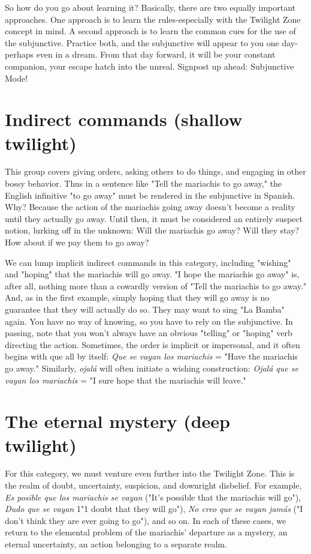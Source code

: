 \documentclass[14pt,a4paper,oneside]{memoir}
\begin{document}
So how do you go about learning it? Basically, there are two
equally important approaches. One approach is to learn the
rules-especially with the Twilight Zone concept in mind. A second
approach is to learn the common cues for the use of the subjunctive.
Practice both, and the subjunctive will appear to you one day-perhaps
even in a dream. From that day forward, it will be your constant companion, your escape hatch into the unreal. Signpost up ahead: Subjunctive Mode!

\section{Indirect commands (shallow twilight)}

This group covers giving orders, asking others to do things,
and engaging in other bossy behavior. Thus in a sentence like "Tell the
mariachis to go away," the English infinitive "to go away" must be rendered in the subjunctive in Spanish. Why? Because the action of the
mariachis going away doesn't become a reality until they actually go
away. Until then, it must be considered an entirely suspect notion,
lurking off in the unknown: Will the mariachis go away? Will they
stay? How about if we pay them to go away?

We can lump implicit indirect commands in this category, including "wishing" and "hoping" that the mariachis will go away. "I
hope the mariachis go away" is, after all, nothing more than a cowardly version of "Tell the mariachis to go away." And, as in the first
example, simply hoping that they will go away is no guarantee that
they will actually do so. They may want to sing "La Bamba" again.
You have no way of knowing, so you have to rely on the subjunctive. In
passing, note that you won't always have an obvious "telling" or "hoping" verb directing the action. Sometimes, the order is implicit or impersonal, and it often begins with que all by itself: \emph{Que se vayan los
mariachis} = "Have the mariachis go away." Similarly, \emph{ojalá} will often
initiate a wishing construction: \emph{Ojalá que se vayan los mariachis} =
"I sure hope that the mariachis will leave."

\section{The eternal mystery (deep twilight)}

For this category, we must venture even further into the Twilight Zone. This is the realm of doubt, uncertainty, suspicion, and
downright disbelief. For example, \emph{Es posible que los mariachis se
vayan} ("It's possible that the mariachis will go"), \emph{Dudo que se vayan}
1"1 doubt that they will go"), \emph{No creo que se vayan jamás} ("I don't
think they are ever going to go"), and so on. In each of these cases, we
return to the elemental problem of the mariachis' departure as a mystery, an eternal uncertainty, an action belonging to a separate realm.
\end{document}
